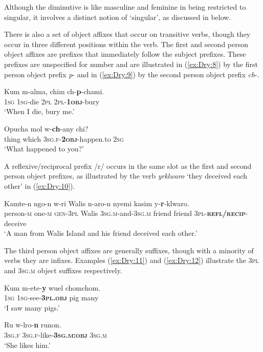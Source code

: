 \documentclass[output=collectionpaper]{langsci/langscibook}
\begin{document}
Although the diminutive is like masculine and feminine in being restricted to singular, it involves a distinct notion of `singular', as discussed in  below.

There is also a set of object affixes that occur on transitive verbs, though they occur in three different positions within the verb. The first and second person object affixes are prefixes that immediately follow the subject prefixes. These prefixes are unspecified for number and are illustrated in (\ref{ex:Dry:8}) by the first person object prefix \textit{p}{}- and in (\ref{ex:Dry:9}) by the second person object prefix \textit{ch}{}-.

\ea \label{ex:Dry:8}
\gll Kum	m-alma,	chim	ch-\textbf{p}-chami. \\
\textsc{1sg} \textsc{1sg}{}-die \textsc{2pl} \textsc{2pl}-\textbf{\textsc{1obj}}-bury\\
\glt `When I die, bury me.'
\z

\ea \label{ex:Dry:9}
\gll Opucha	mol	w-\textbf{ch}-any	chi?\\
thing which \textsc{3sg.f}-\textbf{\textsc{2obj}}-happen.to \textsc{2sg}\\
\glt `What happened to you?'
\z

A reflexive/reciprocal prefix /r/ occurs in the same slot as the first and second person object prefixes, as illustrated by the verb \textit{yrklwaro} `they deceived each other' in (\ref{ex:Dry:10}).

\ea \label{ex:Dry:10}
\gll Kamte-n	ngo-n	w-ri	Walis	n-aro-n nyemi	kasim	y-\textbf{r}-klwaro.\\
person-\textsc{m} one-\textsc{m} \textsc{gen}-\textsc{3pl} Walis \textsc{3sg.m}-and-\textsc{3sg.m} friend friend \textsc{3pl}-\textbf{\textsc{refl/recip}}-deceive\\
\glt  `A man from Walis Island and his friend deceived each other.'
\z

The third person object affixes are generally suffixes, though with a minority of verbs they are infixes. Examples (\ref{ex:Dry:11}) and (\ref{ex:Dry:12}) illustrate the \textsc{3pl} and \textsc{3sg.m} object suffixes respectively.

\ea \label{ex:Dry:11}
\gll Kum	m-ete-\textbf{y}	wuel	chomchom.\\
\textsc{1sg} \textsc{1sg}-see-\textbf{\textsc{3pl.obj}} pig many\\
\glt `I saw many pigs.'
\z

\ea \label{ex:Dry:12}
\gll Ru	w-lro-\textbf{n}	runon.\\
\textsc{3sg.f} \textsc{3sg.f}-like-\textbf{\textsc{3sg.m:obj}} \textsc{3sg.m}\\
\glt `She likes him.'
\z
\end{document}
